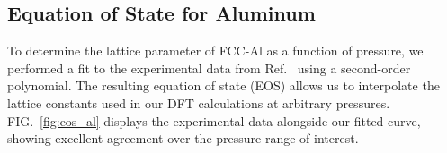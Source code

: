 \documentclass[%
 reprint,
superscriptaddress,
 amsmath,amssymb,
 aps,
prx,
]{revtex4-2}
\begin{document}
\begin{appendices}
\section{Equation of State for Aluminum}
\label{sec:app:al_pressure}
To determine the lattice parameter of FCC-Al as a function of pressure, we performed a fit to the experimental data from Ref.~\cite{Al_EOS} using a second-order polynomial. The resulting equation of state (EOS) allows us to interpolate the lattice constants used in our DFT calculations at arbitrary pressures. FIG.~\ref{fig:eos_al} displays the experimental data alongside our fitted curve, showing excellent agreement over the pressure range of interest.


\end{appendices}
\end{document}
